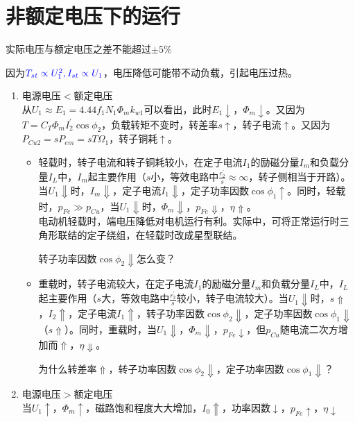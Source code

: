 \documentclass[blue]{elegantnote}
\begin{document}
\section{非额定电压下的运行}
实际电压与额定电压之差不能超过{\color{thid}$\pm5\%$}
\begin{note}
	因为${\color{blue}T_{st}\propto U_{1}^{2},I_{st}\propto U_{1}}$，电压降低可能带不动负载，引起电压过热。
\end{note}
\begin{enumerate}
	\item 电源电压$<$额定电压\\
	从$U_1\approx E_1=4.44f_1N_1\Phi_mk_{w1}$可以看出，此时$E_1\downarrow$，$\Phi_m\downarrow$。又因为$T=C_T\Phi_mI_2^{'}\cos\phi_2$，负载转矩不变时，转差率$s\uparrow$，转子电流$\uparrow$。又因为{\color{blue}$P_{Cu2}=sP_{em}=sT\Omega_1$}，转子铜耗$\uparrow$。
	\begin{itemize}
		\item {\color{blue}轻载时，转子电流和转子铜耗}{\color{blue}较小，在定子电流$I_1$的励磁分量$I_m$和负载分量$I_L$中，$I_m$起主要作用}（$s$小，等效电路中$\frac{r_2^{'}}{s}\approx \infty $，转子侧相当于开路）。当$U_1\Downarrow$时，$I_m\Downarrow$，定子电流$I_1\Downarrow$，{\color{thid}定子功率因数$\cos\phi_1\uparrow$}。同时，轻载时，$p_{Fe}\gg p_{Cu}$，当$U_1\Downarrow$时，$\Phi_m\Downarrow$，$p_{Fe}\Downarrow$，{\color{thid}$\eta \Uparrow$}。\\
		电动机轻载时，端电压降低对电机运行有利。实际中，可将正常运行时三角形联结的定子绕组，在轻载时改成星型联结。
		\begin{note}
			{\color{main2}转子功率因数$\cos\phi_2\Downarrow$怎么变？}
		\end{note}
		\item {\color{blue}重载时，转子电流较大，在定子电流$I_1$的励磁分量$I_m$和负载分量$I_L$中，$I_L$起主要作用}（$s$大，等效电路中$\frac{r_2^{'}}{s} $较小，转子电流较大）。当$U_1\Downarrow$时，$s\Uparrow$，$I_2\Uparrow$，定子电流$I_1\Uparrow$，{\color{thid}转子功率因数$\cos\phi_2\Downarrow$，定子功率因数$\cos\phi_1\Downarrow$（$s\Uparrow$）}。同时，重载时，当$U_1\Downarrow$，$\Phi_m\Downarrow$，$p_{Fe}\downarrow$，但$p_{Cu}$随电流二次方增加而$\Uparrow$，{\color{thid}$\eta \Downarrow$}。
		\begin{note}
			{\color{main2}为什么转差率$\Uparrow$，转子功率因数$\cos\phi_2\Downarrow$，定子功率因数$\cos\phi_1\Downarrow$？}
		\end{note}
	\end{itemize}
	\item 电源电压$>$额定电压\\
	当$U_1\uparrow$，$\Phi_m\uparrow$，磁路饱和程度大大增加，$I_0\Uparrow$，功率因数$\downarrow$，$p_{Fe}\uparrow$，$\eta \downarrow$
\end{enumerate}
\end{document}
